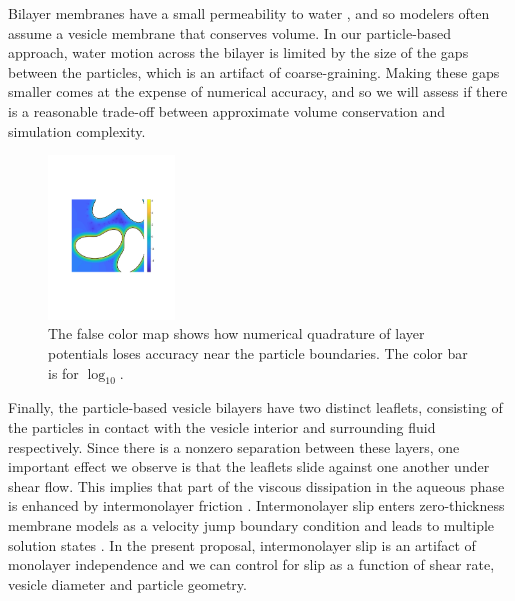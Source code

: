 Bilayer membranes have a small permeability to water \cite{323e9a2f0c58487ea82518d7a1f96485},
and so modelers often assume a vesicle membrane that conserves volume. In our particle-based approach, water motion across
the bilayer is limited by the size of the gaps between the particles, which is an artifact of coarse-graining.
Making these gaps smaller comes at the expense of numerical accuracy, and so we will assess if there is a reasonable trade-off
between approximate volume conservation and simulation complexity. 

\begin{figure}
\centerline{\includegraphics[width=0.30\textwidth]{figures/BIError.pdf}}
  \vspace{-8pt}
\caption{
\label{fig:bierror}  
\footnotesize The false color map shows how numerical quadrature of
  layer potentials loses accuracy near the particle boundaries.  The
  color bar is for $\log_{10}.$}
\end{figure}

Finally, the particle-based vesicle bilayers have two distinct leaflets,
consisting of the particles in contact with the vesicle interior and 
surrounding fluid respectively. Since there is a nonzero separation between these layers,
one important effect we observe is that the leaflets slide against one another under shear flow. 
This implies that part of the viscous dissipation in the aqueous phase is enhanced by intermonolayer friction
\cite{SHKULIPA2005823, ShkulipaThesis}.
Intermonolayer slip enters zero-thickness membrane models as a velocity jump boundary condition
and leads to multiple solution states \cite{schwalbe_vlahovska_miksis_2010}.
In the present proposal, intermonolayer slip is an artifact of monolayer independence  
and we can control for slip as a function of shear rate, vesicle diameter and particle geometry.


